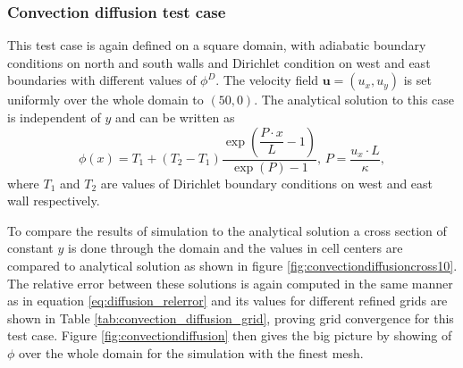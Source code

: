 \documentclass[]{article}
\begin{document}
\subsubsection{Convection diffusion test case}
This test case is again defined on a square domain, with adiabatic boundary conditions on north and south walls and Dirichlet condition on west and east boundaries with different values of $ \phi^D $. The velocity field $ \mathbf{u} = \left( u_x, u_y\right) $ is set uniformly over the whole domain to $ \left( 50,0\right) $. The analytical solution to this case is independent of $ y $ and can be written as 
\begin{equation}\label{eq:convection_anal}
\phi(x) = T_1 + (T_2 - T_1) \dfrac{\exp\left(\dfrac{P\cdot x 	}{L}-1\right)}{\exp\left(P\right)-1},\, P = \dfrac{u_x \cdot L}{\kappa},
\end{equation}
where $ T_1 $ and $ T_2 $ are values of Dirichlet boundary conditions on west and east wall respectively.

To compare the results of simulation to the analytical solution a cross section of constant $ y $ is done through the domain and the values in cell centers are compared to analytical solution as shown in figure \ref{fig:convectiondiffusioncross10}. The relative error between these solutions is again computed in the same manner as in equation \ref{eq:diffusion_relerror} and its values for different refined grids are shown in Table \ref{tab:convection_diffusion_grid}, proving grid convergence for this test case. Figure \ref{fig:convectiondiffusion} then gives the big picture by showing of $ \phi $ over the whole domain for the simulation with the finest mesh.
\end{document}
